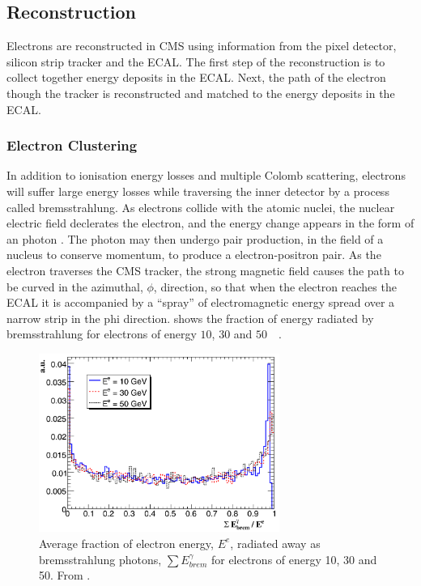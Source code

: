 \subsection{Reconstruction}
Electrons are reconstructed in CMS using information from the pixel detector,
silicon strip tracker and the ECAL.
The first step of the reconstruction is to collect together energy deposits in
the ECAL. Next, the path of the electron though the tracker is reconstructed and
matched to the energy deposits in the ECAL.

\subsubsection{Electron Clustering}

In addition to ionisation energy losses and multiple Colomb scattering,
electrons will suffer large energy losses while traversing the inner detector
by a process called bremsstrahlung. 
As electrons collide with the atomic nuclei, the nuclear electric field
declerates the electron, and the energy change appears in the form of an photon
\cite{perkins}.  
The photon may then undergo pair production, in the field of a nucleus to
conserve momentum, to produce a electron-positron pair.
As the electron traverses the CMS tracker, the strong magnetic
field causes the path to be curved in the azimuthal, $\phi$,
direction, so that when the electron reaches the \acs{ECAL} it is accompanied
by a ``spray'' of electromagnetic energy spread over a narrow strip in the phi direction.
 shows the fraction of energy radiated by bremsstrahlung for
electrons of energy $10$, $30$ and \unit{$50$}{\GeV} \cite{eReco}.

\begin{figure}[htbp]
  \centering
  \includegraphics[width=0.7\textwidth]{brem}
  \caption{Average fraction of electron energy, $E^{e}$, radiated away as bremsstrahlung
photons, $\sum E_{brem}^{\gamma}$ for electrons of energy 10, 30 and
\unit{50}{\GeV}. From \cite{eReco}.}
\label{fig:brem}
\end{figure}

